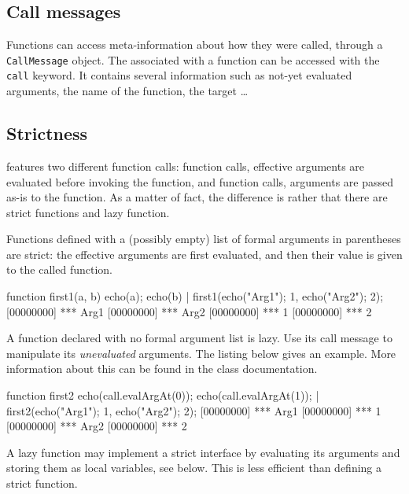 \subsection{Call messages}
\label{sec:us-fun-callmsg}

Functions can access meta-information about how they were called,
through a \lstinline|CallMessage| object. The 
associated with a function can be accessed with the \lstinline|call|
keyword. It contains several information such as not-yet evaluated
arguments, the name of the function, the target \ldots

\subsection{Strictness}

\us features two different function calls:
 function calls, effective arguments are
evaluated before invoking the function, and 
function calls, arguments are passed as-is to the function.  As a
matter of fact, the difference is rather that there are strict
functions and lazy function.

Functions defined with a (possibly empty) list of formal arguments in
parentheses are strict: the effective arguments are first evaluated,
and then their value is given to the called function.

\begin{urbiscript}
function first1(a, b) {
  echo(a); echo(b)
}|
first1({echo("Arg1"); 1},
       {echo("Arg2"); 2});
[00000000] *** Arg1
[00000000] *** Arg2
[00000000] *** 1
[00000000] *** 2
\end{urbiscript}

A function declared with no formal argument list is lazy.  Use its
call message to manipulate its \emph{unevaluated} arguments.
The listing below gives an example.  More information about
this can be found in the  class documentation.

\begin{urbiscript}
function first2
{
  echo(call.evalArgAt(0));
  echo(call.evalArgAt(1));
}|
first2({echo("Arg1"); 1},
       {echo("Arg2"); 2});
[00000000] *** Arg1
[00000000] *** 1
[00000000] *** Arg2
[00000000] *** 2
\end{urbiscript}

A lazy function may implement a strict interface by evaluating its
arguments and storing them as local variables, see below.  This is
less efficient than defining a strict function.

